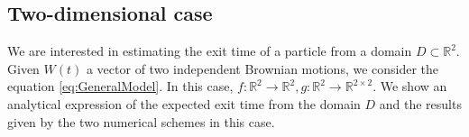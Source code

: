 \subsection{Two-dimensional case}
We are interested in estimating the exit time of a particle from a domain $D\subset\mathbb{R}^2$. Given $W(t)$ a  vector of two independent Brownian motions, we consider the equation \eqref{eq:GeneralModel}. In this case, $f\colon \mathbb{R}^2 \rightarrow \mathbb{R}^2, g\colon \mathbb{R}^2 \rightarrow \mathbb{R}^{2\times 2}$. We show an analytical expression of the expected exit time from the domain $D$ and the results given by the two numerical schemes in this case.





